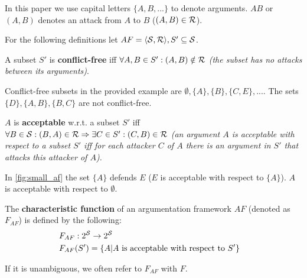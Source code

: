 \begin{notation}
In this paper we use capital letters $\{A, B, ...\}$ to denote arguments. $AB$ or $(A, B)$ denotes an attack from $A$ to $B$ ($(A,B) \in \R$).	
\end{notation}

For the following definitions let $AF=\langle \S, \R \rangle, S' \subseteq \S$.

\begin{definition}
 A subset $S'$ is \textbf{conflict-free} iff $ \forall A, B \in S': (A, B) \notin \R$ \textit{(the subset has no attacks between its arguments)}.
\end{definition}
\begin{exa}
Conflict-free subsets in the provided example are $\emptyset, \{A\}, \{B\}, \{C, E\}, ...$. The sets $\{D\}, \{A, B\}, \{B, C\}$ are not conflict-free.
\end{exa}

\begin{definition}
$A$ is \textbf{acceptable} w.r.t. a subset $S'$ iff  $\forall B \in \S: (B, A) \in \R \Rightarrow \exists C \in S': (C, B) \in \R$ \textit{(an argument $A$ is acceptable with respect to a subset $S'$ iff for each attacker $C$ of $A$ there is an argument in $S'$ that attacks this attacker of $A$). }
\end{definition}

\begin{exa}
In  \autoref{fig:small_af} the set $\{A\}$ defends $E$ ($E$ is acceptable with respect to $\{A\}$). $A$ is acceptable with respect to $\emptyset$.
\end{exa}


\begin{definition}
The \textbf{characteristic function} of an argumentation framework $AF$ (denoted as $F_{AF}$) is defined by the following:
	\begin{align*}
		&F_{AF}: 2^{\S} \rightarrow 2^\S &\\
		&F_{AF}(S') = \{A | A~\text{is acceptable with respect to}~S'\} &
	\end{align*}
\end{definition}
\begin{notation}
	If it is unambiguous, we often refer to $F_{AF}$ with $F$. 
\end{notation}


